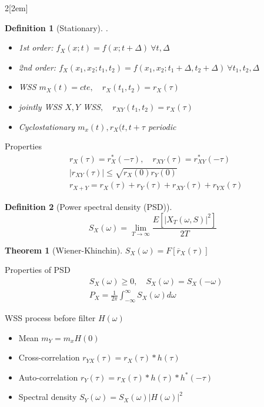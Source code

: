 \documentclass{myclass}
\newtheorem*{definition}{Definition}
\newtheorem*{theorem}{Theorem}
\begin{document}
\begin{multicols}{2}[\columnsep2em]
\begin{definition}[Stationary] .
  \begin{itemize}[topsep=-6pt, itemsep=0pt]
    \item 1st order:  $f_X(x;t)=f(x; t+\Delta ) \ \forall t, \Delta $
    \item 2nd order:  $f_X(x_1, x_2;t_1,t_2)=f(x_1,x_2; t_1+\Delta, t_2+\Delta ) \ \forall t_1, t_2, \Delta $
	\item WSS  $m_X(t) = cte, \quad r_X(t_1, t_2) = r_X(\tau )$
	\item jointly WSS  $X, Y $ WSS$, \quad r_{XY}(t_1, t_2) = r_X(\tau )$
	\item Cyclostationary $m_x(t), r_X(t, t+\tau $ periodic
  \end{itemize}
\end{definition}

Properties
\begin{align*}
& r_{X}(\tau ) = r^*_{X}(-\tau ), \quad r_{XY}(\tau ) = r^*_{XY}(-\tau )\\
& |r_{XY}(\tau )| \le \sqrt{r_X(0)r_Y(0)}\\
& r_{X+Y} = r_X(\tau ) + r_Y(\tau ) + r_{XY}(\tau ) + r_{YX}(\tau )
\end{align*}

\begin{definition}[Power spectral density (PSD)]
\[
S_X(\omega ) = \lim_{T\to  \infty} \frac{E[|X_T(\omega , S)|^2]}{2T}
\]
\end{definition}

\begin{theorem}[Wiener-Khinchin]
  $S_X(\omega )=F[\overline{r}_X(\tau )]$
\end{theorem}

Properties of PSD
\begin{align*}
  & S_X(\omega ) \ge 0, \quad S_X(\omega ) = S_X(-\omega ) \\
  & P_X = \frac{1}{2\pi} \int_{-\infty}^{\infty} S_X(\omega ) d\omega 
\end{align*}

WSS process before filter $H(\omega )$
\begin{itemize}[topsep=-6pt, itemsep=0pt]
  \item Mean $m_Y = m_xH(0)$
  \item  Cross-correlation  $r_{YX}(\tau ) = r_X(\tau )\ast h(\tau )$ 
  \item Auto-correlation $r_Y(\tau )=r_X(\tau )\ast h(\tau )\ast h^*(-\tau )$
  \item Spectral density $S_Y(\omega ) = S_X(\omega )|H(\omega )|^2$
\end{itemize}


\end{multicols}
\end{document}
